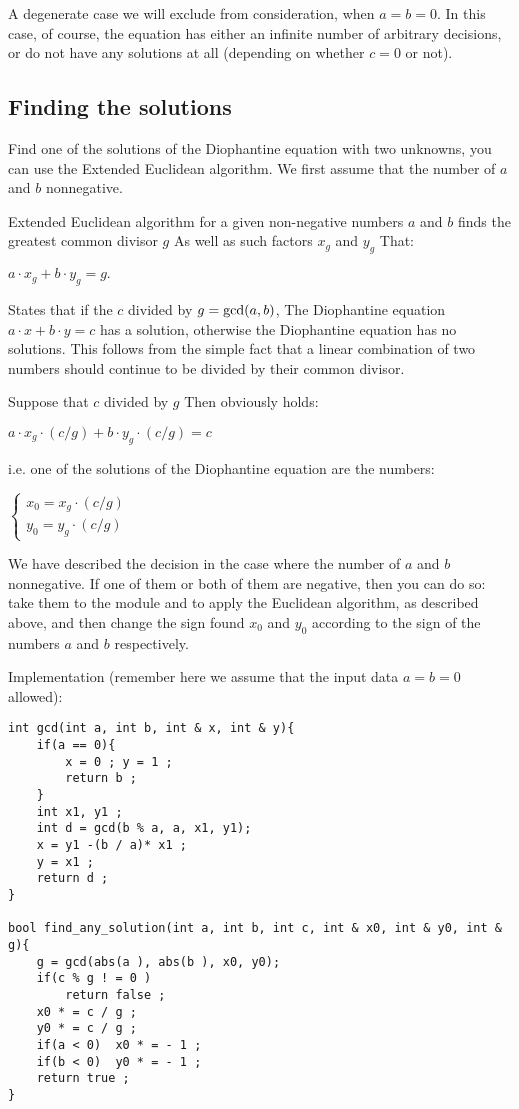 A degenerate case we will exclude from consideration, when $a = b = 0$. In this case, of course, the equation has either an infinite number of arbitrary decisions, or do not have any solutions at all (depending on whether $c = 0$ or not).

\subsection{ Finding the solutions }

Find one of the solutions of the Diophantine equation with two unknowns, you can use the Extended Euclidean algorithm. We first assume that the number of $a$ and $b$ nonnegative.

Extended Euclidean algorithm for a given non-negative numbers $a$ and $b$ finds the greatest common divisor $g$ As well as such factors $x_g$ and $y_g$ That:

$a \cdot x_g + b \cdot y_g = g.$

States that if the $c$ divided by $g = {\rm gcd} (a, b)$, The Diophantine equation $a \cdot x + b \cdot y = c$ has a solution, otherwise the Diophantine equation has no solutions. This follows from the simple fact that a linear combination of two numbers should continue to be divided by their common divisor.

Suppose that $c$ divided by $g$ Then obviously holds:

$a\cdot x_{g}\cdot(c/g)+b\cdot y_{g}\cdot(c/g)=c$

i.e. one of the solutions of the Diophantine equation are the numbers:

$\begin{cases}
x_{0}=x_{g}\cdot(c/g)\\
y_{0}=y_{g}\cdot(c/g)
\end{cases}$

We have described the decision in the case where the number of $a$ and $b$ nonnegative. If one of them or both of them are negative, then you can do so: take them to the module and to apply the Euclidean algorithm, as described above, and then change the sign found $x_0$ and $y_0$ according to the sign of the numbers $a$ and $b$ respectively.

Implementation (remember here we assume that the input data $a = b = 0$ allowed):

\begin{verbatim}
int gcd(int a, int b, int & x, int & y){
    if(a == 0){
        x = 0 ; y = 1 ;
        return b ;
    }
    int x1, y1 ;
    int d = gcd(b % a, a, x1, y1);
    x = y1 -(b / a)* x1 ;
    y = x1 ;
    return d ;
}
 
bool find_any_solution(int a, int b, int c, int & x0, int & y0, int & g){
    g = gcd(abs(a ), abs(b ), x0, y0);
    if(c % g ! = 0 )
        return false ;
    x0 * = c / g ;
    y0 * = c / g ;
    if(a < 0)  x0 * = - 1 ;
    if(b < 0)  y0 * = - 1 ;
    return true ;
} 
\end{verbatim}
